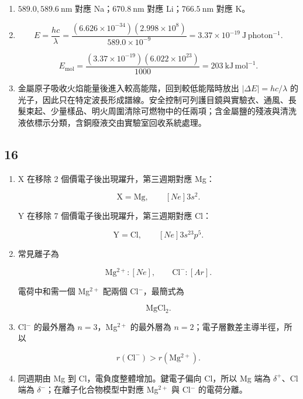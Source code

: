 \documentclass[11pt,a4paper]{article}
\begin{document}
\begin{enumerate}
\def\labelenumi{\arabic{enumi}.}
\item
  \(589.0,589.6\ \mathrm{nm}\) 對應 Na；\(670.8\ \mathrm{nm}\) 對應 Li；\(766.5\ \mathrm{nm}\) 對應 K。
\item
  \[
  E=\frac{hc}{\lambda}
  =\frac{(6.626\times10^{-34})(2.998\times10^8)}
  {589.0\times10^{-9}}
  =3.37\times10^{-19}\ \mathrm{J\,photon^{-1}}.
  \]

  \[
  E_{\mathrm{mol}}
  =\frac{(3.37\times10^{-19})(6.022\times10^{23})}{1000}
  =203\ \mathrm{kJ\,mol^{-1}}.
  \]
\item
  金屬原子吸收火焰能量後進入較高能階，回到較低能階時放出 \(|\Delta E|=hc/\lambda\) 的光子，因此只在特定波長形成譜線。安全控制可列護目鏡與實驗衣、通風、長髮束起、少量樣品、明火周圍清除可燃物中的任兩項；含金屬鹽的殘液與清洗液依標示分類，含銅廢液交由實驗室回收系統處理。
\end{enumerate}

\subsection{16}\label{section-15}

\begin{enumerate}
\def\labelenumi{\arabic{enumi}.}
\item
  X 在移除 2 個價電子後出現躍升，第三週期對應 Mg：

  \[
  \mathrm X=\mathrm{Mg},\qquad [Ne]3s^2.
  \]

  Y 在移除 7 個價電子後出現躍升，第三週期對應 Cl：

  \[
  \mathrm Y=\mathrm{Cl},\qquad [Ne]3s^23p^5.
  \]
\item
  常見離子為

  \[
  \mathrm{Mg^{2+}}:[Ne],
  \qquad
  \mathrm{Cl^-}:[Ar].
  \]

  電荷中和需一個 Mg\(^{2+}\) 配兩個 Cl\(^-\)，最簡式為

  \[
  \mathrm{MgCl_2}.
  \]
\item
  Cl\(^-\) 的最外層為 \(n=3\)，Mg\(^{2+}\) 的最外層為 \(n=2\)；電子層數差主導半徑，所以

  \[
  r(\mathrm{Cl^-})>r(\mathrm{Mg^{2+}}).
  \]
\item
  同週期由 Mg 到 Cl，電負度整體增加。鍵電子偏向 Cl，所以 Mg 端為 \(\delta^+\)、Cl 端為 \(\delta^-\)；在離子化合物模型中對應 Mg\(^{2+}\) 與 Cl\(^-\) 的電荷分離。
\end{enumerate}
\end{document}
